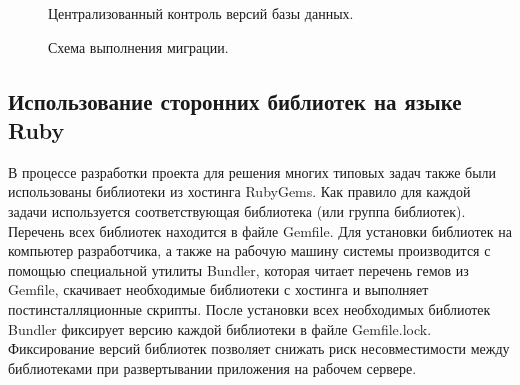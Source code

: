 \begin{figure}[h]
\caption{Централизованный контроль версий базы данных.}
\label{ris:development_migrations}

% 
% 
% 

\end{figure}

\begin{figure}[h]
\caption{Схема выполнения миграции.}
\label{ris:migration_algorithm}

% 
% 

\end{figure}

\subsection{Использование сторонних библиотек на языке Ruby}
В процессе разработки проекта для решения многих типовых задач также были
использованы библиотеки из хостинга RubyGems. Как правило для каждой задачи
используется соответствующая библиотека (или группа библиотек). Перечень всех
библиотек находится в файле Gemfile. Для установки библиотек на компьютер
разработчика, а также на рабочую машину системы производится с помощью
специальной утилиты Bundler, которая читает перечень гемов из Gemfile, скачивает
необходимые библиотеки с хостинга и выполняет постинсталляционные скрипты. После
установки всех необходимых библиотек Bundler фиксирует версию каждой библиотеки
в файле Gemfile.lock. Фиксирование версий библиотек позволяет снижать риск
несовместимости между библиотеками при развертывании приложения на рабочем
сервере.

